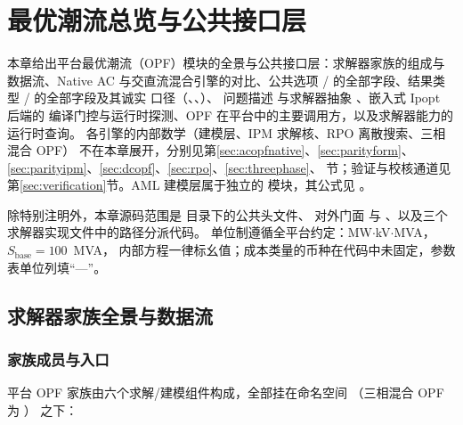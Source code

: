 \section{最优潮流总览与公共接口层}\label{sec:overview}

本章给出平台最优潮流（OPF）模块的全景与公共接口层：求解器家族的组成与
数据流、Native AC 与交直流混合引擎的对比、公共选项 /
的全部字段、结果类型 / 的全部字段及其诚实
口径（、、）、
问题描述  与求解器抽象 、嵌入式 Ipopt 后端的
编译门控与运行时探测、OPF 在平台中的主要调用方，以及求解器能力的运行时查询。
各引擎的内部数学（建模层、IPM 求解核、RPO 离散搜索、三相混合 OPF）
不在本章展开，分别见第\ref{sec:acopfnative}、\ref{sec:parityform}、
\ref{sec:parityipm}、\ref{sec:dcopf}、\ref{sec:rpo}、\ref{sec:threephase}、
节；验证与校核通道见第\ref{sec:verification}节。AML 建模层属于独立的
 模块，其公式见
。

除特别注明外，本章源码范围是
 目录下的公共头文件、
对外门面  与
、以及三个求解器实现文件中的路径分派代码。
单位制遵循全平台约定：MW$\cdot$kV$\cdot$MVA，$S_{\mathrm{base}}=100$~MVA，
内部方程一律标幺值；成本类量的币种在代码中未固定，参数表单位列填“—”。

\subsection{求解器家族全景与数据流}\label{subsec:overview-family}

\subsubsection*{家族成员与入口}

平台 OPF 家族由六个求解/建模组件构成，全部挂在命名空间
（三相混合 OPF 为 ）
之下：

